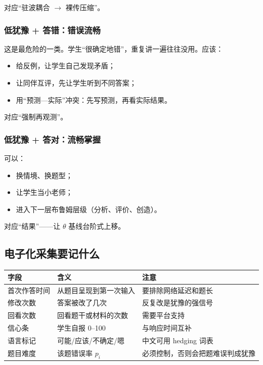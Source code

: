 \documentclass[UTF8,a4paper,11pt]{ctexart}
\begin{document}
对应“驻波耦合 $\to$ 裸传压缩”。

\subsubsection{低犹豫 + 答错：错误流畅}

这是最危险的一类。学生“很确定地错”，重复讲一遍往往没用。应该：

\begin{itemize}[leftmargin=2em]
\item 给反例，让学生自己发现矛盾；
\item 让同伴互评，先让学生听到不同答案；
\item 用“预测—实际”冲突：先写预测，再看实际结果。
\end{itemize}

对应“强制再观测”。

\subsubsection{低犹豫 + 答对：流畅掌握}

可以：

\begin{itemize}[leftmargin=2em]
\item 换情境、换题型；
\item 让学生当小老师；
\item 进入下一层布鲁姆层级（分析、评价、创造）。
\end{itemize}

对应“结果”——让 $\theta$ 基线台阶式上移。

\subsection{电子化采集要记什么}

\begin{center}
\begin{longtable}{@{}p{3.6cm}p{4.2cm}p{6.2cm}@{}}
\toprule
\textbf{字段} & \textbf{含义} & \textbf{注意} \\
\midrule
首次作答时间 & 从题目呈现到第一次输入 & 要排除网络延迟和题长 \\
修改次数 & 答案被改了几次 & 反复改是犹豫的强信号 \\
回看次数 & 回看题干或材料的次数 & 需要平台支持 \\
信心条 & 学生自报 0--100 & 与响应时间互补 \\
语言标记 & 可能/应该/不确定/嗯 & 中文可用 hedging 词表 \\
题目难度 & 该题错误率 $p_i$ & 必须控制，否则会把题难误判成犹豫 \\
\bottomrule
\end{longtable}
\end{center}
\end{document}
